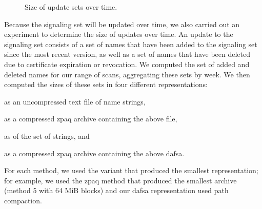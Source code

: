 \begin{figure}[t]
  \centering
  \caption{Size of update sets over time.}
  \label{fig:updates}
\end{figure}

Because the signaling set will be updated over time, we also carried out an
experiment to determine the size of updates over time. An update to the
signaling set consists of a set of names that have been added to the signaling
set since the most recent version, as well as a set of names that have been
deleted due to certificate expiration or revocation. We computed the set of
added and deleted names for our range of scans, aggregating these sets by week.
We then computed the sizes of these sets in four different representations:
\begin{inparaenum}[(1)]
\item as an uncompressed text file of name strings,
\item as a compressed zpaq archive containing the above file,
\item as  of the set of strings, and
\item as a compressed zpaq archive containing the above \ac{dafsa}.
\end{inparaenum}
For each method, we used the variant that produced the smallest representation;
for example, we used the zpaq method that produced the smallest archive (method
5 with 64 MiB blocks) and our \ac{dafsa} representation used path compaction.

